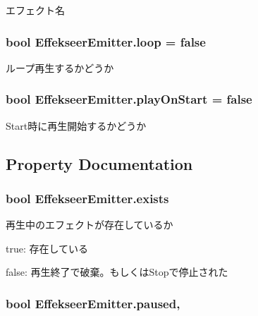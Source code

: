 エフェクト名 

\hypertarget{class_effekseer_emitter_a9b6a18e54c4b4a68bb9b81fc88b123bd}{
\subsubsection[{loop}]{\setlength{\rightskip}{0pt plus 5cm}bool Effekseer\-Emitter.\-loop = false}}\label{class_effekseer_emitter_a9b6a18e54c4b4a68bb9b81fc88b123bd}


ループ再生するかどうか 

\hypertarget{class_effekseer_emitter_a8ff5bc48852b4a21e3b33b0cd0e8b65a}{
\subsubsection[{play\-On\-Start}]{\setlength{\rightskip}{0pt plus 5cm}bool Effekseer\-Emitter.\-play\-On\-Start = false}}\label{class_effekseer_emitter_a8ff5bc48852b4a21e3b33b0cd0e8b65a}


Start時に再生開始するかどうか 



\subsection{Property Documentation}
\hypertarget{class_effekseer_emitter_aa4b49f6d532b7e75f2d207866ecee574}{
\subsubsection[{exists}]{\setlength{\rightskip}{0pt plus 5cm}bool Effekseer\-Emitter.\-exists\hspace{0.3cm}{\ttfamily [get]}}}\label{class_effekseer_emitter_aa4b49f6d532b7e75f2d207866ecee574}


再生中のエフェクトが存在しているか 

true\-: 存在している

false\-: 再生終了で破棄。もしくは\-Stopで停止された\hypertarget{class_effekseer_emitter_a5979b4e756a1f31e439752de6fb86c64}{
\subsubsection[{paused}]{\setlength{\rightskip}{0pt plus 5cm}bool Effekseer\-Emitter.\-paused\hspace{0.3cm}{\ttfamily [get]}, {\ttfamily [set]}}}\label{class_effekseer_emitter_a5979b4e756a1f31e439752de6fb86c64}


